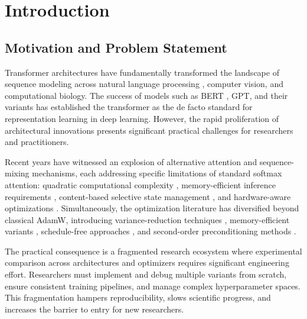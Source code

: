 \section{Introduction}

\subsection{Motivation and Problem Statement}

Transformer architectures have fundamentally transformed the landscape of sequence modeling across natural language processing \citep{vaswani_attention_2017}, computer vision, and computational biology. The success of models such as BERT \citep{devlin_bert_2019}, GPT, and their variants has established the transformer as the de facto standard for representation learning in deep learning. However, the rapid proliferation of architectural innovations presents significant practical challenges for researchers and practitioners.

Recent years have witnessed an explosion of alternative attention and sequence-mixing mechanisms, each addressing specific limitations of standard softmax attention: quadratic computational complexity \citep{child_sparse_transformer_2019}, memory-efficient inference requirements \citep{sun_retentive_2023,gu_mamba_2023}, content-based selective state management \citep{behrouz_titans_2025}, and hardware-aware optimizations \citep{ramapuram_theory_2024}. Simultaneously, the optimization literature has diversified beyond classical AdamW, introducing variance-reduction techniques \citep{xie_adan_2022,pagliardini_ademamix_2024,yuan_mars_2024}, memory-efficient variants \citep{shazeer_adafactor_2018,zhao_galore_2024}, schedule-free approaches \citep{defazio_road_2024}, and second-order preconditioning methods \citep{gupta_shampoo_2018,vyas_soap_2024}.

The practical consequence is a fragmented research ecosystem where experimental comparison across architectures and optimizers requires significant engineering effort. Researchers must implement and debug multiple variants from scratch, ensure consistent training pipelines, and manage complex hyperparameter spaces. This fragmentation hampers reproducibility, slows scientific progress, and increases the barrier to entry for new researchers.

